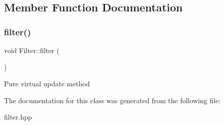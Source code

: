 \subsection{Member Function Documentation}
\mbox{\label{class_filter_a68763fa259eb46616b104d7342d727f1}} 
\subsubsection{\texorpdfstring{filter()}{filter()}}
{\footnotesize\ttfamily void Filter\+::filter (\begin{DoxyParamCaption}{ }\end{DoxyParamCaption})\hspace{0.3cm}{\ttfamily [inline]}}

Pure virtual update method 

The documentation for this class was generated from the following file\+:\begin{DoxyCompactItemize}
\item 
filter.\+hpp\end{DoxyCompactItemize}
